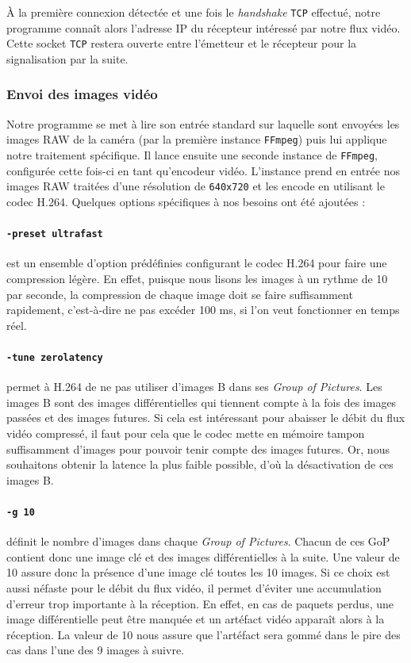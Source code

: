 \documentclass[11pt,a4paper]{article}
\begin{document}
\bigbreak
À la première connexion détectée et une fois le \textit{handshake} \texttt{TCP} effectué, notre programme connaît alors l'adresse IP du récepteur intéressé par notre flux vidéo.
Cette socket \texttt{TCP} restera ouverte entre l'émetteur et le récepteur pour la signalisation par la suite.

\subsubsection{Envoi des images vidéo}
Notre programme se met à lire son entrée standard sur laquelle sont envoyées les images RAW de la caméra (par la première instance \texttt{FFmpeg}) puis lui applique notre traitement spécifique.
Il lance ensuite une seconde instance de \texttt{FFmpeg}, configurée cette fois-ci en tant qu'encodeur vidéo.
L'instance prend en entrée nos images RAW traitées d'une résolution de \texttt{640x720} et les encode en utilisant le codec H.264.
Quelques options spécifiques à nos besoins ont été ajoutées :

\paragraph{\texttt{-preset ultrafast}} est un ensemble d'option prédéfinies configurant le codec H.264 pour faire une compression légère.
En effet, puisque nous lisons les images à un rythme de 10 par seconde, la compression de chaque image doit se faire suffisamment rapidement, c'est-à-dire ne pas excéder 100 ms, si l'on veut fonctionner en temps réel.

\paragraph{\texttt{-tune zerolatency}} permet à H.264 de ne pas utiliser d'images B dans ses \textit{Group of Pictures}.
Les images B sont des images différentielles qui tiennent compte à la fois des images passées et des images futures.
Si cela est intéressant pour abaisser le débit du flux vidéo compressé, il faut pour cela que le codec mette en mémoire tampon suffisamment d'images pour pouvoir tenir compte des images futures.
Or, nous souhaitons obtenir la latence la plus faible possible, d'où la désactivation de ces images B.

\paragraph{\texttt{-g 10}} définit le nombre d'images dans chaque \textit{Group of Pictures}.
Chacun de ces GoP contient donc une image clé et des images différentielles à la suite.
Une valeur de 10 assure donc la présence d'une image clé toutes les 10 images.
Si ce choix est aussi néfaste pour le débit du flux vidéo, il permet d'éviter une accumulation d'erreur trop importante à la réception.
En effet, en cas de paquets perdus, une image différentielle peut être manquée et un artéfact vidéo apparaît alors à la réception.
La valeur de 10 nous assure que l'artéfact sera gommé dans le pire des cas dans l'une des 9 images à suivre.
\end{document}
